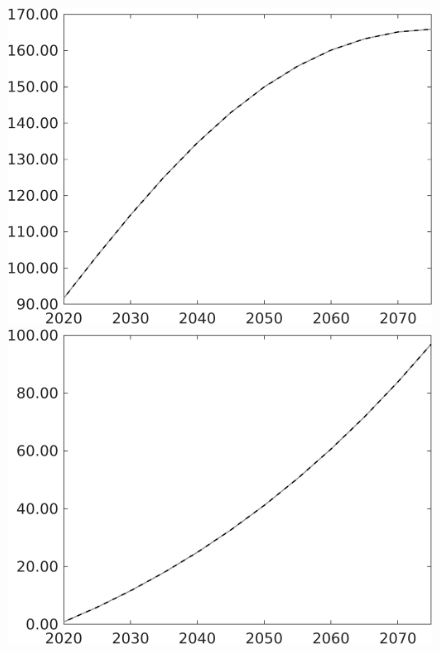 \documentclass[12pt]{article}
\begin{document}
\begin{figure}[h!!]
\begin{minipage}[]{0.32\textwidth}
	\end{minipage}		
	\begin{minipage}[]{0.32\textwidth}
		\includegraphics[width=1\textwidth]{../../codding_model/own_basedOnFried/optimalPol_010922_revision/figures/all_13Sept22/PerdifNoTauf_Equlab_regime0_CompTaul_pee_spillover0_nsk1_xgr0_knspil1_sep1_LFlimit0_emsbase0_countec0_GovRev0_etaa0.79_lgd0.png}
	\end{minipage}	
	\begin{minipage}[]{0.32\textwidth}
		\includegraphics[width=1\textwidth]{../../codding_model/own_basedOnFried/optimalPol_010922_revision/figures/all_13Sept22/PerdifNoTauf_Equlab_regime0_CompTaul_pf_spillover0_nsk1_xgr0_knspil1_sep1_LFlimit0_emsbase0_countec0_GovRev0_etaa0.79_lgd0.png}

\end{minipage}
\end{figure}
\end{document}
